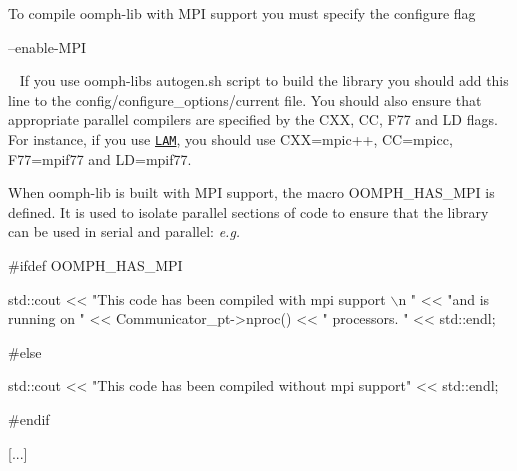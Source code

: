 \begin{DoxyItemize}
\item To compile {\ttfamily oomph-\/lib} with M\+PI support you must specify the configure flag ~\newline
~\newline

\begin{DoxyCode}
--enable-MPI
\end{DoxyCode}
 ~\newline
 If you use {\ttfamily oomph-\/lib\textquotesingle{}s} {\ttfamily autogen.\+sh} script to build the library you should add this line to the {\ttfamily config/configure\+\_\+options/current} file. You should also ensure that appropriate parallel compilers are specified by the {\ttfamily C\+XX}, {\ttfamily CC}, {\ttfamily F77} and {\ttfamily LD} flags. For instance, if you use \href{http://www.lam-mpi.org/}{\tt L\+AM}, you should use {\ttfamily C\+XX=mpic++}, {\ttfamily CC=mpicc}, {\ttfamily F77=mpif77} and {\ttfamily LD=mpif77}. ~\newline
~\newline

\item When {\ttfamily oomph-\/lib} is built with M\+PI support, the macro {\ttfamily O\+O\+M\+P\+H\+\_\+\+H\+A\+S\+\_\+\+M\+PI} is defined. It is used to isolate parallel sections of code to ensure that the library can be used in serial and parallel\+: {\itshape  e.\+g. } ~\newline
~\newline

\begin{DoxyCode}
[...]

\textcolor{preprocessor}{#ifdef OOMPH\_HAS\_MPI}

   std::cout << \textcolor{stringliteral}{"This code has been compiled with mpi support \(\backslash\)n "} 
             << \textcolor{stringliteral}{"and is running on "} << Communicator\_pt->nproc() 
             << \textcolor{stringliteral}{" processors. "} << std::endl;

\textcolor{preprocessor}{#else}

   std::cout << \textcolor{stringliteral}{"This code has been compiled without mpi support"} 
             << std::endl;

\textcolor{preprocessor}{#endif}

[...]
\end{DoxyCode}
 ~\newline

\end{DoxyItemize}



